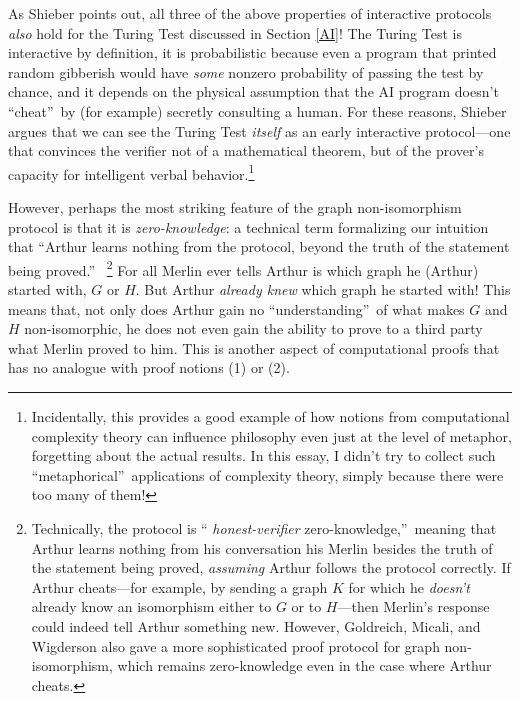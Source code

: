 \documentclass[12pt,onecolumn]{article}%
\begin{document}
As Shieber \cite{shieber} points out, all three of the above properties of
interactive protocols \textit{also} hold for the Turing Test discussed in
Section \ref{AI}! The Turing Test is interactive by definition, it is
probabilistic because even a program that printed random gibberish would have
\textit{some} nonzero probability of passing the test by chance, and it
depends on the physical assumption that the AI program doesn't
\textquotedblleft cheat\textquotedblright\  by (for example) secretly
consulting a human. For these reasons, Shieber argues that we can see the
Turing Test \textit{itself} as an early interactive protocol---one that
convinces the verifier not of a mathematical theorem, but of the prover's
capacity for intelligent verbal behavior.\footnote{Incidentally, this provides
a good example of how notions from computational complexity theory can
influence philosophy even just at the level of metaphor, forgetting about the
actual results. In this essay, I didn't try to collect such
\textquotedblleft metaphorical\textquotedblright\  applications of complexity
theory, simply because there were too many of them!}

However, perhaps the most striking feature of the graph non-isomorphism
protocol is that it is \textit{zero-knowledge}: a technical term formalizing
our intuition that \textquotedblleft Arthur learns nothing from the
protocol, beyond the truth of the statement being proved.\textquotedblright\ %
\footnote{Technically, the protocol is \textquotedblleft%
\textit{honest-verifier} zero-knowledge,\textquotedblright\  meaning that
Arthur learns nothing from his conversation his Merlin besides the truth of
the statement being proved, \textit{assuming} Arthur follows the protocol
correctly. If Arthur cheats---for example, by sending a graph $K$ for which
he \textit{doesn't} already know an isomorphism either to $G$ or to $H$---then
Merlin's response could indeed tell Arthur something new. However,
Goldreich, Micali, and Wigderson \cite{gmw} also gave a more sophisticated
proof protocol for graph non-isomorphism, which remains zero-knowledge even in
the case where Arthur cheats.} For all Merlin ever tells Arthur is which
graph he (Arthur) started with, $G$ or $H$. But Arthur \textit{already knew}
which graph he started with! This means that, not only does Arthur gain no
\textquotedblleft understanding\textquotedblright\  of what makes $G$ and $H$
non-isomorphic, he does not even gain the ability to prove to a third party
what Merlin proved to him. This is another aspect of computational proofs
that has no analogue with proof notions (1) or (2).
\end{document}
